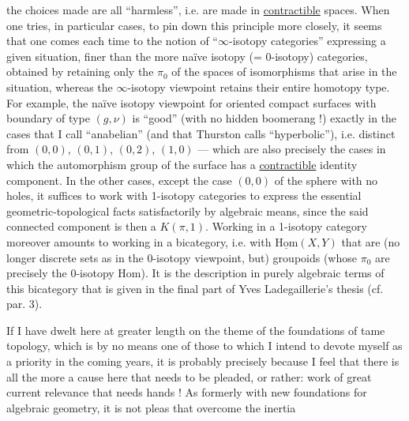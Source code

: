 
the choices made are all ``harmless'', i.e. are made
in \uline{contractible} spaces. When one tries, in particular
cases, to pin down this principle more closely, it seems that one comes
each time to the notion of ``$\infty$-isotopy categories'' expressing
a given situation, finer than the more naïve isotopy
(= 0-isotopy) categories, obtained by retaining only the $\pi_0$
of the spaces of isomorphisms that arise in the situation,
whereas the $\infty$-isotopy viewpoint retains their entire
homotopy type. For example, the naïve isotopy viewpoint for
oriented compact surfaces with boundary of type $(g,\nu)$ is ``good''
(with no hidden boomerang !) exactly in the cases that I call
``anabelian'' (and that Thurston calls ``hyperbolic''), i.e. distinct
from $(0,0)$, $(0,1)$, $(0,2)$, $(1,0)$ --- which are also precisely the cases
in which the automorphism group of the surface has a
\uline{contractible} identity component. In the other cases, except
the case $(0,0)$ of the sphere with no holes, it suffices to work with
1-isotopy categories to express the essential geometric-topological
facts satisfactorily by algebraic means, since
the said connected component is then a $K(\pi,1)$. Working
in a 1-isotopy category moreover amounts to working
in a bicategory, i.e. with $\underline{\mathrm{Hom}}(X,Y)$ that are (no longer
discrete sets as in the 0-isotopy viewpoint,
but) groupoids (whose $\pi_0$ are precisely the
0-isotopy Hom). It is the description in purely algebraic
terms of this bicategory that is given in the final part
of Yves Ladegaillerie's thesis (cf. par. 3).

If I have dwelt here at greater length on the theme
of the foundations of tame topology, which is by no means one of
those to which I intend to devote myself as a priority in the
coming years, it is probably precisely because I feel that
there is all the more a cause here that needs to be pleaded, or
rather: work of great current relevance that needs hands !
As formerly with new foundations for algebraic
geometry, it is not pleas that overcome the inertia

